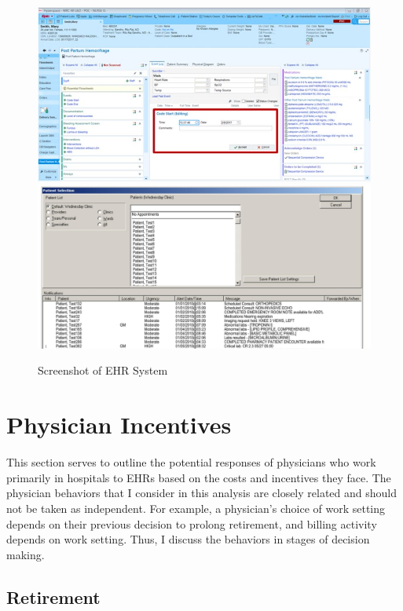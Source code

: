 \documentclass[11pt]{article}
\begin{document}
\begin{figure}[ht]
    \centering
    \caption{Screenshot of EHR System}
    \includegraphics[scale=.4]{Objects/epic-ehr-screenshot.jpg}
    \includegraphics[scale=.115]{Objects/EHRimage2.jpg}
    \label{fig:EPIC}
\end{figure}


\section{Physician Incentives}

This section serves to outline the potential responses of physicians who work primarily in hospitals to EHRs based on the costs and incentives they face. The physician behaviors that I consider in this analysis are closely related and should not be taken as independent. For example, a physician's choice of work setting depends on their previous decision to prolong retirement, and billing activity depends on work setting. Thus, I discuss the behaviors in stages of decision making. 

\subsection{Retirement}
\end{document}
